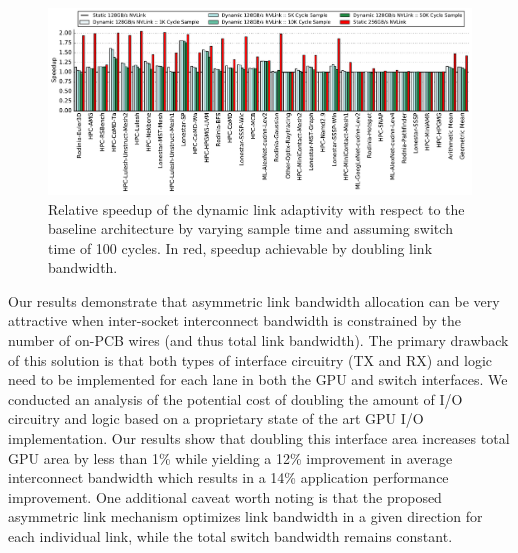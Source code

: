 \begin{figure}[tp]
    \centering
    \includegraphics[width=1.0\textwidth]{figures/plot_nvlink_sample_time.pdf}
    \caption{Relative speedup of the dynamic link adaptivity with respect to
	the baseline architecture by varying sample time and assuming switch 
time of
	100 cycles. In red, speedup achievable by doubling link 
bandwidth.}
    \label{fig:sampletime}
    \vspace{-.2in}
\end{figure}

Our results demonstrate that asymmetric link bandwidth
allocation can be very attractive when inter-socket interconnect bandwidth is constrained 
by the number of on-PCB wires (and thus total link bandwidth).
The primary drawback of this solution is that both types of interface circuitry (TX and RX)
and logic need to be implemented for each lane in both the GPU and switch interfaces.
We conducted an analysis of the potential cost of doubling the amount
of I/O circuitry and logic based on a proprietary state of
the art GPU I/O implementation. Our results show that doubling this interface area
increases total GPU area by less than 1\% while yielding a 12\% improvement in average
interconnect bandwidth which results in a 14\% application performance improvement.  
One additional caveat worth noting is that the proposed asymmetric link
mechanism optimizes link bandwidth in a given direction for each individual
link, while the total switch bandwidth remains constant.
 




